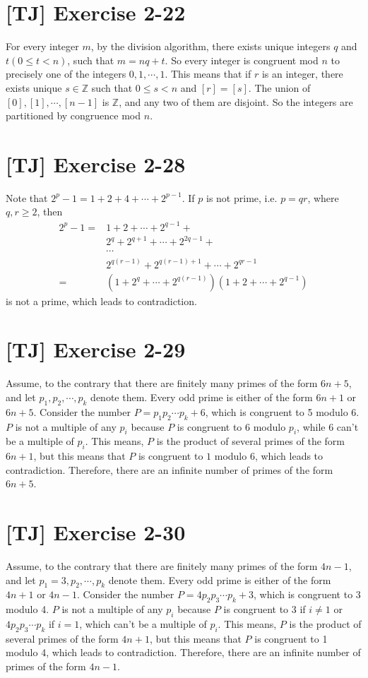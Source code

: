 \documentclass[a4paper,11pt,twocolumn]{article}
\begin{document}
  \section{[TJ] Exercise 2-22}
  For every integer $m$, by the division algorithm, there exists unique integers $q$ and $t (0 \leq t < n)$, such that $m = nq + t$. So every integer is congruent mod $n$ to precisely one of the integers $0, 1, \cdots, 1$. This means that if $r$ is an integer, there exists unique $s \in \mathbb{Z}$ such that $0 \leq s < n$ and $[r] = [s]$. The union of $[0], [1], \cdots, [n-1]$ is $\mathbb{Z}$, and any two of them are disjoint. So the integers are partitioned by congruence mod $n$.

  \section{[TJ] Exercise 2-28}
  Note that $2^p - 1 = 1 + 2 + 4 + \cdots + 2^{p-1}$. If $p$ is not prime, i.e. $p = qr$, where $q, r \geq 2$, then
  \begin{align*}
    2^p - 1 =& 1 + 2 + \cdots + 2^{q-1} + \\
             & 2^q + 2^{q+1} + \cdots + 2^{2q-1} + \\
             & \cdots \\
             & 2^{q(r-1)} + 2^{q(r-1)+1} + \cdots + 2^{qr-1} \\
            =& (1 + 2^q + \cdots + 2^{q(r-1)}) (1 + 2 + \cdots + 2^{q-1})
  \end{align*}
  is not a prime, which leads to contradiction.

  \section{[TJ] Exercise 2-29}
  Assume, to the contrary that there are finitely many primes of the form $6n+5$, and let $p_1, p_2, \cdots, p_k$ denote them. Every odd prime is either of the form $6n+1$ or $6n+5$. Consider the number $P = p_1p_2 \cdots p_k + 6$, which is congruent to 5 modulo 6. $P$ is not a multiple of any $p_i$ because $P$ is congruent to $6$ modulo $p_i$, while $6$ can't be a multiple of $p_i$. This means, $P$ is the product of several primes of the form $6n+1$, but this means that $P$ is congruent to $1$ modulo 6, which leads to contradiction. Therefore, there are an infinite number of primes of the form $6n+5$.

  \section{[TJ] Exercise 2-30}
  Assume, to the contrary that there are finitely many primes of the form $4n-1$, and let $p_1 = 3, p_2, \cdots, p_k$ denote them. Every odd prime is either of the form $4n+1$ or $4n-1$. Consider the number $P = 4p_2p_3 \cdots p_k + 3$, which is congruent to 3 modulo 4. $P$ is not a multiple of any $p_i$ because $P$ is congruent to 3 if $i \neq 1$ or $4p_2p_3 \cdots p_k$ if $i = 1$, which can't be a multiple of $p_i$. This means, $P$ is the product of several primes of the form $4n+1$, but this means that $P$ is congruent to 1 modulo 4, which leads to contradiction. Therefore, there are an infinite number of primes of the form $4n-1$.
\end{document}
